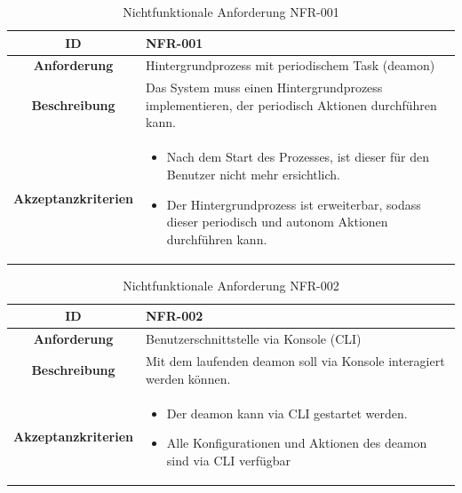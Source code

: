 \documentclass[a4paper,12pt]{report}
\begin{document}
    \begin{table}[h!]
        \centering
        \setlength{\leftmargini}{0.4cm}
        \begin{tabular}{|c|p{10cm}|}
            \hline
            \textbf{ID}           & NFR-001                                                                                            \\ \hline
            \textbf{Anforderung}  & Hintergrundprozess mit periodischem Task (deamon)                                                  \\ \hline
            \textbf{Beschreibung} & Das System muss einen Hintergrundprozess implementieren, der periodisch Aktionen durchführen kann. \\ \hline
            \textbf{Akzeptanzkriterien} &
            \begin{itemize}
                \item Nach dem Start des Prozesses, ist dieser für den Benutzer nicht mehr ersichtlich.
                \item Der Hintergrundprozess ist erweiterbar, sodass dieser periodisch und autonom Aktionen durchführen kann.
            \end{itemize}
            \\ \hline
        \end{tabular}
        \caption{Nichtfunktionale Anforderung NFR-001}\label{tab:nfr-1}
    \end{table}

    \begin{table}[h!]
        \centering
        \setlength{\leftmargini}{0.4cm}
        \begin{tabular}{|c|p{10cm}|}
            \hline
            \textbf{ID}           & NFR-002                                                              \\ \hline
            \textbf{Anforderung}  & Benutzerschnittstelle via Konsole (CLI)                              \\ \hline
            \textbf{Beschreibung} & Mit dem laufenden deamon soll via Konsole interagiert werden können. \\ \hline
            \textbf{Akzeptanzkriterien} &
            \begin{itemize}
                \item Der deamon kann via CLI gestartet werden.
                \item Alle Konfigurationen und Aktionen des deamon sind via CLI verfügbar
            \end{itemize}
            \\ \hline
        \end{tabular}
        \caption{Nichtfunktionale Anforderung NFR-002}\label{tab:table4}
    \end{table}
\end{document}
